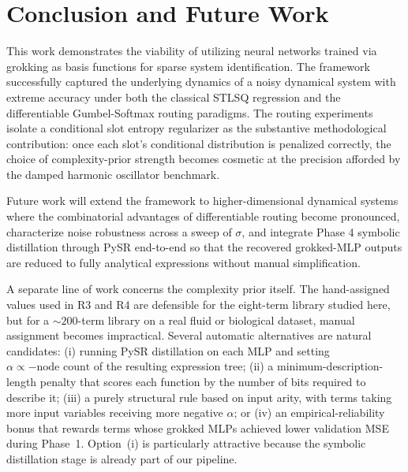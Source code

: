 \documentclass[conference]{IEEEtran}
\begin{document}
\section{Conclusion and Future Work}
This work demonstrates the viability of utilizing neural networks trained via grokking as basis functions for sparse system identification. The framework successfully captured the underlying dynamics of a noisy dynamical system with extreme accuracy under both the classical STLSQ regression and the differentiable Gumbel-Softmax routing paradigms. The routing experiments isolate a conditional slot entropy regularizer as the substantive methodological contribution: once each slot's conditional distribution is penalized correctly, the choice of complexity-prior strength becomes cosmetic at the precision afforded by the damped harmonic oscillator benchmark.

Future work will extend the framework to higher-dimensional dynamical systems where the combinatorial advantages of differentiable routing become pronounced, characterize noise robustness across a sweep of $\sigma$, and integrate Phase 4 symbolic distillation through PySR end-to-end so that the recovered grokked-MLP outputs are reduced to fully analytical expressions without manual simplification.

A separate line of work concerns the complexity prior itself. The hand-assigned values used in R3 and R4 are defensible for the eight-term library studied here, but for a $\sim 200$-term library on a real fluid or biological dataset, manual assignment becomes impractical. Several automatic alternatives are natural candidates: (i) running PySR distillation on each MLP and setting $\alpha \propto -\text{node count}$ of the resulting expression tree; (ii) a minimum-description-length penalty that scores each function by the number of bits required to describe it; (iii) a purely structural rule based on input arity, with terms taking more input variables receiving more negative $\alpha$; or (iv) an empirical-reliability bonus that rewards terms whose grokked MLPs achieved lower validation MSE during Phase~1. Option~(i) is particularly attractive because the symbolic distillation stage is already part of our pipeline.
\end{document}

